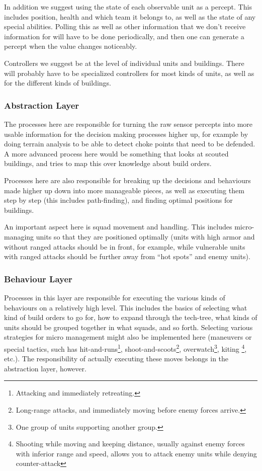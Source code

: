 In addition we suggest using the state of each observable unit as a percept.
This includes position, health and which team it belongs to, as well as the
state of any special abilities. Polling this as well as other information that
we don't receive information for will have to be done periodically, and then
one can generate a percept when the value changes noticeably.

Controllers we suggest be at the level of individual units and buildings. There
will probably have to be specialized controllers for most kinds of units, as
well as for the different kinds of buildings.

\subsubsection{Abstraction Layer}
The processes here are responsible for turning the raw sensor percepts into
more usable information for the decision making processes higher up, for
example by doing terrain analysis to be able to detect choke points that need
to be defended. A more advanced process here would be something that looks at
scouted buildings, and tries to map this over knowledge about build orders.

Processes here are also responsible for breaking up the decisions and behaviours
made higher up down into more manageable pieces, as well as executing them step
by step (this includes path-finding), and finding optimal positions for
buildings.

An important aspect here is squad movement and handling. This includes
micro-managing units so that they are positioned optimally (units with high
armor and without ranged attacks should be in front, for example, while
vulnerable units with ranged attacks should be further away from ``hot spots''
and enemy units).

\subsubsection{Behaviour Layer}
Processes in this layer are responsible for executing the various kinds of
behaviours on a relatively high level. This includes the basics of selecting
what kind of build orders to go for, how to expand through the tech-tree, what
kinds of units should be grouped together in what squads, and so forth.
Selecting various strategies for micro management might also be implemented here
(maneuvers or special tactics, such has hit-and-runs\footnote{Attacking and
immediately retreating.}, shoot-and-scoots\footnote{Long-range attacks, and
immediately moving before enemy forces arrive.}, overwatch\footnote{One group of
units supporting another group.}, kiting \footnote{Shooting while moving and
keeping distance, usually against enemy forces with inferior range and speed,
allows you to attack enemy units while denying counter-attack}, etc.). The
responsibility of actually executing these moves belongs in the abstraction
layer, however.

